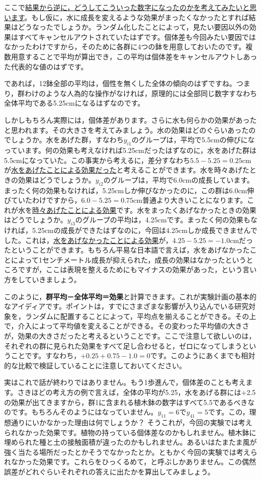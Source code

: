 \documentclass{ltjbook}
\begin{document}
ここで\underline{結果から逆に，どうしてこういった数字になったのかを考えてみたいと思います}。もし仮に，水に成長を変えるような効果がまったくなかったとすれば結果はどうなったでしょうか。ランダム化したことによって，見たい要因以外の効果はすべてキャンセルアウトされていたはずです。個体差も今回みたい要因ではなかったわけですから，そのために各群に4つの鉢を用意しておいたのです。複数用意することで平均が算出でき，この平均は個体差をキャンセルアウトしあった代表的な値のはずです。

であれば，12鉢全部の平均は，個性を無くした全体の傾向のはずですね。つまり，群わけのような人為的な操作がなければ，原理的には全部同じ数字すなわち全体平均である5.25cmになるはずなのです。

しかしもちろん実際には，個体差があります。さらに水も何らかの効果があったと思われます。その大きさを考えてみましょう。水の効果はどのぐらいあったのでしょうか。水をあげた群，すなわち$y_{i1}$のグループは，平均で5.5cmの伸びになっています。何の効果も考えなければ5.25cmだったはずなのに，水をあげた群は5.5cmになっていた。この事実から考えるに，差分すなわち$5.5-5.25=0.25$cmが\underline{水をあげたことによる効果だった}と考えることができます。水を時々あげたときの効果はどうでしょうか。$y_{i2}$のグループは，平均で6.0cmの成長しています。まったく何の効果もなければ，5.25cmしか伸びなかったのに，この群は6.0cm伸びていたわけですから，$6.0-5.25=0.75$cm普通より大きいことになります。これが水を\underline{時々あげたことによる効果}です。水をまったくあげなかったときの効果はどうでしょうか。$y_{i3}$のグループの平均は，4.25cmです。まったく何の効果もなければ，5.25cmの成長ができたはずなのに，今回は4.25cmしか成長できませんでした。これは，\underline{水をあげなかったことによる効果}が，$4.25-5.25=-1.0$cmだったということができます。もちろん平易な日本語で言えば，水をあげなかったことによって1センチメートル成長が抑えられた，成長の効果はなかったというところですが，ここは表現を整えるためにもマイナスの効果があった，という言い方をしていきましょう。

このように，\textbf{群平均－全体平均＝効果}と計算できます。これが実験計画の基本的なアイディアです。ポイントは，すでにさまざまな影響が入り込んでいる研究対象を，ランダムに配置することによって，平均点を揃えることができる。その上で，介入によって平均値を変えることができる。その変わった平均値の大きさが，効果の大きさだったと考えるということです。ここで注意して欲しいのは，それぞれの群に見られた効果をすべて足し合わせると，ゼロになってしまうということです。すなわち，$+0.25+0.75-1.0=0$です。このようにあくまでも相対的な比較で検証していることに注意しておいてください。

実はこれで話が終わりではありません。もう1歩進んで，個体差のことも考えます。さきほどの考え方の例で言えば，全体の平均が5.25，水をあげる群には+2.5の効果が出てきますから，群1に含まれる植木鉢の数字はすべて5.5であるべきなのです。もちろんそのようにはなっていません。$y_{11} = 6$で$y_{41}=5$です。この，理想通りにいかなかった理由は何でしょうか？ そうこれが，今回の実験では考えられなかった効果です。植物の持っている個体差なのかもしれません。植木鉢に埋められた種と土の接触面積が違ったのかもしれません。あるいはたまたま風が強く当たる場所だったとかそうでなかったとか。ともかく今回の実験では考えられなかった効果です。これらをひっくるめて，と呼ぶしかありません。この偶然誤差がどれぐらいそれぞれの答えに出たかを算出してみましょう。
\end{document}
